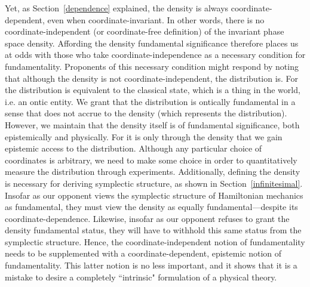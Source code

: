 \documentclass[letterpaper]{article}
\begin{document}
Yet, as Section~\ref{dependence} explained, the density is always coordinate-dependent, even when coordinate-invariant. In other words, there is no coordinate-independent (or coordinate-free definition) of the invariant phase space density. Affording the density fundamental significance therefore places us at odds with those who take coordinate-independence as a necessary condition for fundamentality. Proponents of this necessary condition might respond by noting that although the density is not coordinate-independent, the distribution is. For the distribution is equivalent to the classical state, which is a thing in the world, i.e. an ontic entity. We grant that the distribution is ontically fundamental in a sense that does not accrue to the density (which represents the distribution). However, we maintain that the density itself is of fundamental significance, both epistemically and physically. For it is only through the density that we gain epistemic access to the distribution. Although any particular choice of coordinates is arbitrary, we need to make some choice in order to quantitatively measure the distribution through experiments. Additionally, defining the density is necessary for deriving symplectic structure, as shown in Section~\ref{infinitesimal}. Insofar as our opponent views the symplectic structure of Hamiltonian mechanics as fundamental, they must view the density as equally fundamental---despite its coordinate-dependence. Likewise, insofar as our opponent refuses to grant the density fundamental status, they will have to withhold this same status from the symplectic structure. Hence, the coordinate-independent notion of fundamentality needs to be supplemented with a coordinate-dependent, epistemic notion of fundamentality. This latter notion is no less important, and it shows that it is a mistake to desire a completely ``intrinsic" formulation of a physical theory.
\end{document}
